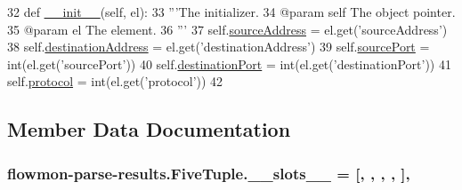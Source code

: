 \begin{DoxyCode}
32     \textcolor{keyword}{def }\hyperlink{classflowmon-parse-results_1_1FiveTuple_a3ca649caaf3ae5f588eca8f7755716c4}{\_\_init\_\_}(self, el):
33         \textcolor{stringliteral}{'''The initializer.}
34 \textcolor{stringliteral}{        @param self The object pointer.}
35 \textcolor{stringliteral}{        @param el The element.}
36 \textcolor{stringliteral}{        '''}
37         self.\hyperlink{classflowmon-parse-results_1_1FiveTuple_a96a23657f51c64ceecf3530bad2a2573}{sourceAddress} = el.get(\textcolor{stringliteral}{'sourceAddress'})
38         self.\hyperlink{classflowmon-parse-results_1_1FiveTuple_acaa5a4c497bc04e7429e2e30bb5d2da9}{destinationAddress} = el.get(\textcolor{stringliteral}{'destinationAddress'})
39         self.\hyperlink{classflowmon-parse-results_1_1FiveTuple_a1a880e7cbea1671266c4c48e3655a8a7}{sourcePort} = int(el.get(\textcolor{stringliteral}{'sourcePort'}))
40         self.\hyperlink{classflowmon-parse-results_1_1FiveTuple_abe1d2214f245803c973729bc0ea1b3bb}{destinationPort} = int(el.get(\textcolor{stringliteral}{'destinationPort'}))
41         self.\hyperlink{classflowmon-parse-results_1_1FiveTuple_a4ed085c9485449c66a351839a0397a23}{protocol} = int(el.get(\textcolor{stringliteral}{'protocol'}))
42         
\end{DoxyCode}


\subsection{Member Data Documentation}
\subsubsection[{\texorpdfstring{\+\_\+\+\_\+slots\+\_\+\+\_\+}{__slots__}}]{\setlength{\rightskip}{0pt plus 5cm}flowmon-\/parse-\/results.\+Five\+Tuple.\+\_\+\+\_\+slots\+\_\+\+\_\+ = \mbox{[}\textquotesingle{}, \textquotesingle{}, \textquotesingle{}, \textquotesingle{}, \textquotesingle{}\mbox{]}\hspace{0.3cm}{\ttfamily [static]}, {\ttfamily [private]}}\hypertarget{classflowmon-parse-results_1_1FiveTuple_aa4e7b4482a4a84a9380c7b7126d29943}{}\label{classflowmon-parse-results_1_1FiveTuple_aa4e7b4482a4a84a9380c7b7126d29943}


